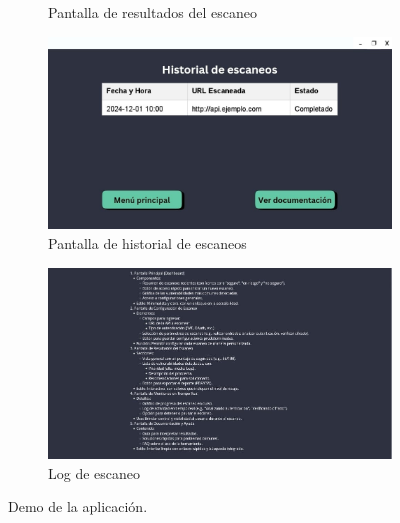 \documentclass{article}
\begin{document}
\begin{figure}[ht]
\begin{subfigure}[b]{0.35\textwidth}
            \caption{Pantalla de resultados del escaneo}
        \end{subfigure}
        \begin{subfigure}[b]{0.35\textwidth}
            \centering
            \includegraphics[width=\textwidth]{Demo2.jpg}
            \caption{Pantalla de historial de escaneos}
        \end{subfigure}
        \begin{subfigure}[b]{0.35\textwidth}
            \centering
            \includegraphics[width=\textwidth]{Demo1.jpg}
            \caption{Log de escaneo}
        \end{subfigure}
        \hfill
        
        \caption{Demo de la aplicación.}
    \end{figure}

    \newpage
\end{document}
